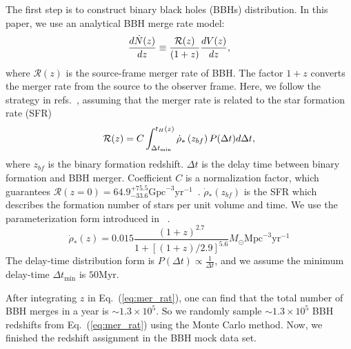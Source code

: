 \documentclass[fleqn,usenatbib]{mnras}
\begin{document}
The first step is to construct binary black holes (BBHs) distribution.
In this paper, we use an analytical BBH merge rate model:
\begin{equation}
\label{eq:mer_rat}
\frac{d \dot{N}(z)}{d z} \equiv \frac{\mathcal{R}(z)}{(1+z)} \frac{d V(z)}{d z} \\,
\end{equation}
where $\mathcal{R}(z)$ is the source-frame merger rate of BBH.
The factor $1+z$ converts the merger rate from the source to the observer frame.
Here, we follow the strategy in refs.~\citep{Haris:2018vmn,Xu:2021bfn,Shan:2023ngi}, assuming that the merger rate is related to the star formation rate (SFR)
\begin{equation}
\mathcal{R}(z)=C \int_{\Delta t_{\min }}^{t_{H}(z)} \dot{\rho}_{*}\left(z_{bf}\right) P(\Delta t) d \Delta t \\,
\end{equation}
where $z_{bf}$ is the binary formation redshift.
$\Delta t$ is the delay time between binary formation and BBH merger.
Coefficient $C$ is a normalization factor, which guarantees $\mathcal{R}(z=0)=64.9^{+75.5}_{-33.6}\mathrm{Gpc}^{-3}\mathrm{yr}^{-1}$~\citep{LIGOScientific:2018jsj}.
$\dot{\rho}_{*}\left(z_{bf}\right)$ is the SFR which describes the formation number of stars per unit volume and time.
We use the parameterization form introduced in ~\citet{Madau:2014bja}.
\begin{equation}
\dot{\rho}_{*}(z)=0.015 \frac{(1+z)^{2.7}}{1+[(1+z) / 2.9]^{5.6}} M_{\odot} \mathrm{Mpc}^{-3} \mathrm{yr}^{-1}
\end{equation}
The delay-time distribution form is $P(\Delta t) \propto \frac{1}{\Delta t}$, and we assume the minimum delay-time $\Delta t_{\min}$ is $50\mathrm{Myr}$.

After integrating $z$ in Eq.~(\ref{eq:mer_rat}), one can find that the total number of BBH merges in a year is $\sim 1.3 \times 10^{5}$.
So we randomly sample $\sim 1.3 \times 10^{5}$ BBH redshifts from Eq.~(\ref{eq:mer_rat}) using the Monte Carlo method.
Now, we finished the redshift assignment in the BBH mock data set. 
\end{document}
